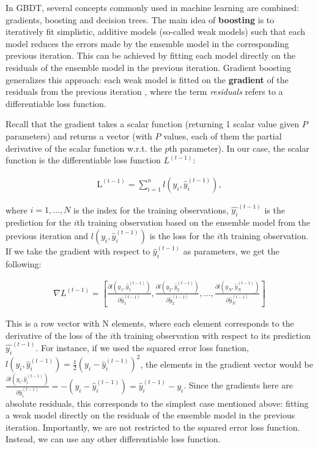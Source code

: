 \documentclass{article}
\begin{document}
	In GBDT, several concepts commonly used in machine learning are combined: gradients, boosting and decision trees. The main idea of \textbf{boosting} is to iteratively fit simplistic, additive models (so-called weak models) such that each model reduces the errors made by the ensemble model in the corresponding previous iteration. This can be achieved by fitting each model directly on the residuals of the ensemble model in the previous iteration. Gradient boosting generalizes this approach: each weak model is fitted on the \textbf{gradient} of the residuals from the previous iteration  \cite{chen_xgboost:_2016} \cite{friedman_greedy_2001}  \cite{noauthor_kaggle_nodate}, where the term \textit{residuals} refers to a differentiable loss function.
	
	Recall that the gradient takes a scalar function (returning 1 scalar value given $P$ parameters) and returns a vector  (with $P$ values, each of them the partial derivative of the scalar function w.r.t. the $p$th parameter). In our case, the scalar function is the differentiable loss function $L^{(t-1)}$:

	\begin{align}
	\mathrm{L^{(t-1)}} = \sum_{i=1}^n l(y_i, \hat{y}_i^{(t-1)}), 
	\end{align} 
	
	where $i = 1, ..., N$ is the index for the training observations, $\hat{y_i}^{(t-1)}$ is the prediction for the $i$th training observation based on the ensemble model from the previous iteration and $l(y_i, \hat{y}_i^{(t-1)})$ is the loss for the $i$th training observation. If we take the gradient with respect to $\hat{y}_i^{(t-1)}$ as parameters, we get the following:
	
	\begin{align}
		\nabla L^{(t-1)} = \left[\frac{\partial l(y_1, \hat{y}_1^{(t-1)})}{\partial \hat{y}_1^{(t-1)}}, \frac{\partial l(y_2, \hat{y}_2^{(t-1)})}{\partial \hat{y}_2^{(t-1)}}, ..., \frac{\partial l(y_N, \hat{y}_N^{(t-1)})}{\partial \hat{y}_N^{(t-1)}}\right]
	\end{align}
	
	This is a row vector with N elements, where each element corresponds to the derivative of the loss of the $i$th training observation with respect to its prediction $\hat{y_i}^{(t-1)}$. For instance, if we used the squared error loss function, $l(y_i, \hat{y}_i^{(t-1)}) = \frac{1}{2} \left(y_i - \hat{y}_i^{(t-1)}\right)^2$, the elements in the gradient vector would be $\frac{\partial l(y_i, \hat{y}_i^{(t-1)})}{\partial \hat{y}_i^{(t-1)}} = -\left(y_i - \hat{y}_i^{(t-1)}\right) = \hat{y}_i^{(t-1)} - y_i$. Since the gradients here are absolute residuals, this corresponds to the simplest case mentioned above: fitting a weak model directly on the residuals of the ensemble model in the previous iteration. Importantly, we are not restricted to the squared error loss function. Instead, we can use any other differentiable loss function.
	
\end{document}
